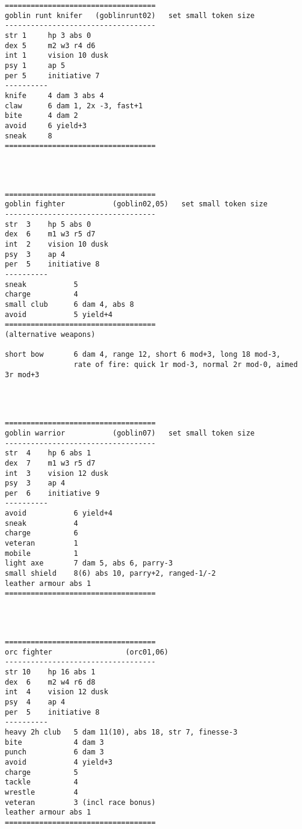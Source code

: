 \small \begin{verbatim}




\end{verbatim} \pagebreak[3] \begin{verbatim}
===================================
goblin runt knifer   (goblinrunt02)   set small token size
-----------------------------------
str 1     hp 3 abs 0
dex 5     m2 w3 r4 d6
int 1     vision 10 dusk
psy 1     ap 5
per 5     initiative 7
----------
knife     4 dam 3 abs 4
claw      6 dam 1, 2x -3, fast+1
bite      4 dam 2
avoid     6 yield+3
sneak     8
===================================




\end{verbatim} \pagebreak[3] \begin{verbatim}
===================================
goblin fighter           (goblin02,05)   set small token size
-----------------------------------
str  3    hp 5 abs 0
dex  6    m1 w3 r5 d7
int  2    vision 10 dusk
psy  3    ap 4
per  5    initiative 8
----------
sneak           5
charge          4
small club      6 dam 4, abs 8
avoid           5 yield+4
===================================
(alternative weapons)

short bow       6 dam 4, range 12, short 6 mod+3, long 18 mod-3,
                rate of fire: quick 1r mod-3, normal 2r mod-0, aimed 3r mod+3




\end{verbatim} \pagebreak[3] \begin{verbatim}
===================================
goblin warrior           (goblin07)   set small token size
-----------------------------------
str  4    hp 6 abs 1
dex  7    m1 w3 r5 d7
int  3    vision 12 dusk
psy  3    ap 4
per  6    initiative 9
----------
avoid           6 yield+4
sneak           4
charge          6
veteran         1
mobile          1
light axe       7 dam 5, abs 6, parry-3
small shield    8(6) abs 10, parry+2, ranged-1/-2
leather armour abs 1
===================================




\end{verbatim} \pagebreak[3] \begin{verbatim}
===================================
orc fighter                 (orc01,06)
-----------------------------------
str 10    hp 16 abs 1
dex  6    m2 w4 r6 d8
int  4    vision 12 dusk
psy  4    ap 4
per  5    initiative 8
----------
heavy 2h club  	5 dam 11(10), abs 18, str 7, finesse-3
bite           	4 dam 3
punch          	6 dam 3
avoid          	4 yield+3
charge         	5
tackle         	4
wrestle        	4
veteran        	3 (incl race bonus)
leather armour abs 1
===================================
\end{verbatim} \normalsize










